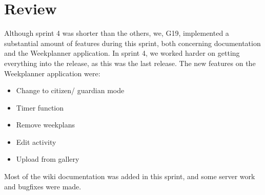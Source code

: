 \section{Review}

Although sprint 4 was shorter than the others, we, \gls{G19}, implemented a substantial amount of features during this sprint, both concerning documentation and the Weekplanner application. In sprint 4, we worked harder on getting everything into the release, as this was the last release.  The new features on the Weekplanner application were:

\begin{itemize}
    \item Change to citizen/ guardian mode
    \item Timer function
    \item Remove weekplans
    \item Edit activity
    \item Upload from gallery
\end{itemize}

Most of the wiki documentation was added in this sprint, and some server work and bugfixes were made.